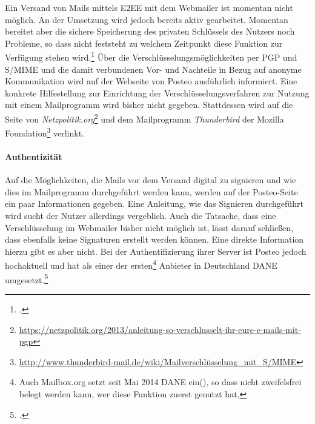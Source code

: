 \documentclass  [paper=a4,
				fontsize=12pt,
				listof=totoc,
				bibliography=totoc
				]{scrreprt}
\begin{document}
						Ein Versand von Mails mittels \ac{E2EE} mit dem Webmailer ist momentan nicht möglich.
						An der Umsetzung wird jedoch bereits aktiv gearbeitet.
						Momentan bereitet aber die sichere Speicherung des privaten Schlüssels des Nutzers noch Probleme, so dass nicht feststeht zu welchem Zeitpunkt diese Funktion zur Verfügung stehen wird.\footcite[Vgl.][]{Posteo2013c}
						Über die Verschlüsselungsmöglichkeiten per \ac{PGP} und \ac{S/MIME} und die damit verbundenen Vor- und Nachteile in Bezug auf anonyme Kommunikation wird auf der Webseite von Posteo ausführlich informiert.
						Eine konkrete Hilfestellung zur Einrichtung der Verschlüsselungsverfahren zur Nutzung mit einem Mailprogramm wird bisher nicht gegeben.
						Stattdessen wird auf die Seite von \textit{Netzpolitik.org}\footnote{\url{https://netzpolitik.org/2013/anleitung-so-verschlusselt-ihr-eure-e-mails-mit-pgp}} und dem Mailprogramm \textit{Thunderbird} der Mozilla Foundation\footnote{\url{http://www.thunderbird-mail.de/wiki/Mailverschlüsselung_mit_S/MIME}} verlinkt.
					
					\paragraph{Authentizität}
						Auf die Möglichkeiten, die Mails vor dem Versand digital zu signieren und wie dies im Mailprogramm durchgeführt werden kann, werden auf der Posteo-Seite ein paar Informationen gegeben.
						Eine Anleitung, wie das Signieren durchgeführt wird sucht der Nutzer allerdings vergeblich.
						Auch die Tatsache, dass eine Verschlüsselung im Webmailer bisher nicht möglich ist, lässt darauf schließen, dass ebenfalls keine Signaturen erstellt werden können.
						Eine direkte Information hierzu gibt es aber nicht.
						Bei der Authentifizierung ihrer Server ist Posteo jedoch hochaktuell und hat als einer der ersten\footnote{Auch Mailbox.org setzt seit Mai 2014 \ac{DANE} ein(\cite[Vgl.][]{Mailbox2014a}), so dass nicht zweifelsfrei belegt werden kann, wer diese Funktion zuerst genutzt hat.} Anbieter in Deutschland \ac{DANE} umgesetzt.\footcite[Vgl.][]{Zivadino14-5}\medskip\\
					
\end{document}
